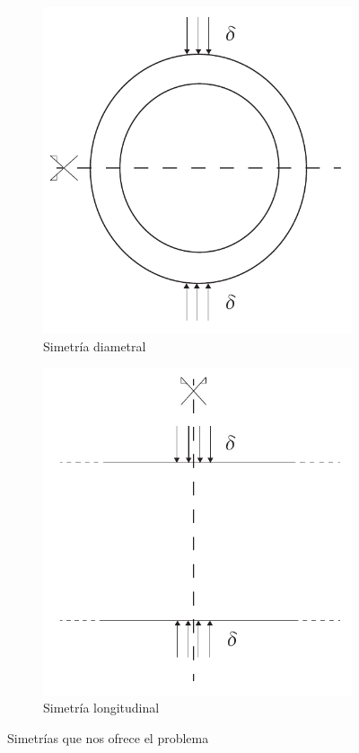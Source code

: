 \begin{figure}[!htp]
\centering
\begin{subfigure}[b]{0.48\textwidth}
\centering
\includegraphics[width=\textwidth]{figuras_3/sim1.pdf}
\caption{Simetría diametral}
\label{fig:a02}
\end{subfigure}
\begin{subfigure}[b]{0.48\textwidth}
\centering
\includegraphics[width=\textwidth]{figuras_3/sim2.pdf}
\caption{Simetría longitudinal}
\label{fig:a03}
\end{subfigure}
\caption{Simetrías que nos ofrece el problema}
\label{fig:a02-03}
\end{figure}

